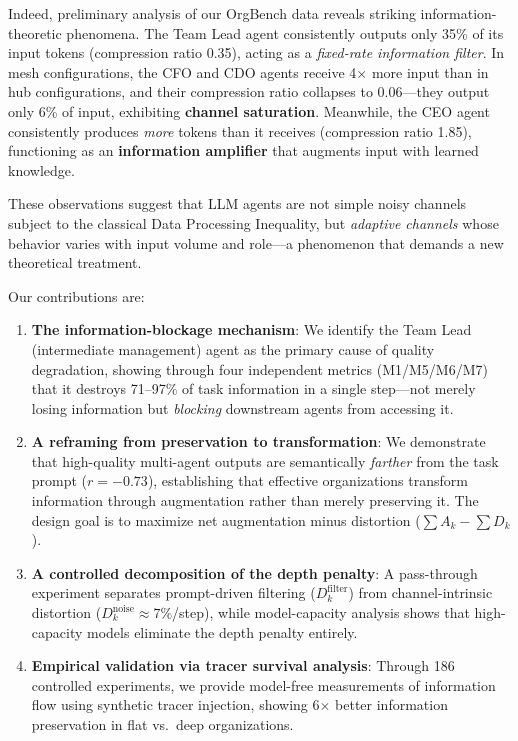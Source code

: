 \documentclass[conference]{IEEEtran}
\begin{document}
Indeed, preliminary analysis of our OrgBench data reveals striking information-theoretic phenomena.
The Team Lead agent consistently outputs only 35\% of its input tokens (compression ratio 0.35), acting as a \emph{fixed-rate information filter}.
In mesh configurations, the CFO and CDO agents receive 4$\times$ more input than in hub configurations, and their compression ratio collapses to 0.06---they output only 6\% of input, exhibiting \textbf{channel saturation}.
Meanwhile, the CEO agent consistently produces \emph{more} tokens than it receives (compression ratio 1.85), functioning as an \textbf{information amplifier} that augments input with learned knowledge.

These observations suggest that LLM agents are not simple noisy channels subject to the classical Data Processing Inequality, but \emph{adaptive channels} whose behavior varies with input volume and role---a phenomenon that demands a new theoretical treatment.

Our contributions are:
\begin{enumerate}
    \item \textbf{The information-blockage mechanism}: We identify the Team Lead (intermediate management) agent as the primary cause of quality degradation, showing through four independent metrics (M1/M5/M6/M7) that it destroys 71--97\% of task information in a single step---not merely losing information but \emph{blocking} downstream agents from accessing it.
    \item \textbf{A reframing from preservation to transformation}: We demonstrate that high-quality multi-agent outputs are semantically \emph{farther} from the task prompt ($r = -0.73$), establishing that effective organizations transform information through augmentation rather than merely preserving it.
    The design goal is to maximize net augmentation minus distortion ($\sum A_k - \sum D_k$).
    \item \textbf{A controlled decomposition of the depth penalty}: A pass-through experiment separates prompt-driven filtering ($D_k^{\text{filter}}$) from channel-intrinsic distortion ($D_k^{\text{noise}} \approx 7\%$/step), while model-capacity analysis shows that high-capacity models eliminate the depth penalty entirely.
    \item \textbf{Empirical validation via tracer survival analysis}: Through 186 controlled experiments, we provide model-free measurements of information flow using synthetic tracer injection, showing 6$\times$ better information preservation in flat vs.\ deep organizations.
\end{enumerate}
\end{document}

